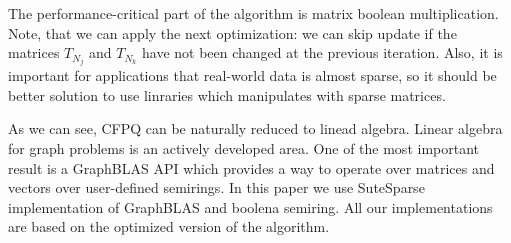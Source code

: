 The performance-critical part of the algorithm is matrix boolean multiplication.
Note, that we can apply the next optimization: we can skip update if the matrices $T_{N_j}$ and $T_{N_k}$ have not been changed at the previous iteration.
Also, it is important for applications that real-world data is almost sparse, so it should be better solution to use linraries which manipulates with sparse matrices.

As we can see, CFPQ can be naturally reduced to linead algebra. 
Linear algebra for graph problems is an actively developed area. 
One of the most important result is a GraphBLAS API which provides a way to operate over matrices and vectors over user-defined semirings.
In this paper we use SuteSparse implementation of GraphBLAS and boolena semiring.
All our implementations are based on the optimized version of the algorithm.